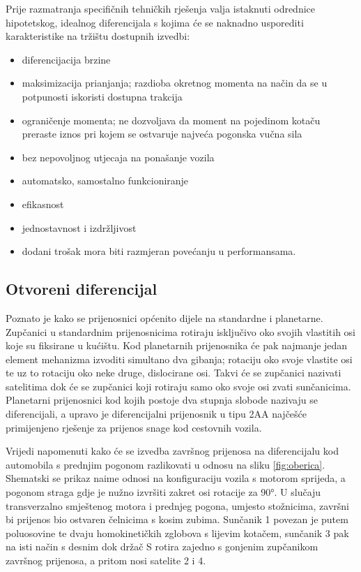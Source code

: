 \documentclass[11pt]{article}
\numberwithin{equation}{section}%
\begin{document}
Prije razmatranja specifičnih tehničkih rješenja valja istaknuti odrednice hipotetskog, idealnog diferencijala s kojima će se naknadno usporediti karakteristike na tržištu dostupnih izvedbi:
\begin{itemize}
\item diferencijacija brzine
\item maksimizacija prianjanja; razdioba okretnog momenta na način da se u potpunosti iskoristi dostupna trakcija
\item ograničenje momenta; ne dozvoljava da moment na pojedinom kotaču preraste iznos pri kojem se ostvaruje najveća pogonska vučna sila
\item bez nepovoljnog utjecaja na ponašanje vozila
\item automatsko, samostalno funkcioniranje
\item efikasnost
\item jednostavnost i izdržljivost
\item dodani trošak mora biti razmjeran povećanju u performansama.
\end{itemize}

	 \subsection{Otvoreni diferencijal}
Poznato je kako se prijenosnici općenito dijele na standardne i planetarne. Zupčanici u standardnim prijenosnicima rotiraju isključivo oko svojih vlastitih osi koje su fiksirane u kućištu. Kod planetarnih prijenosnika će pak najmanje jedan element mehanizma izvoditi simultano dva gibanja; rotaciju oko svoje vlastite osi te uz to rotaciju oko neke druge, dislocirane osi. Takvi će se zupčanici nazivati satelitima dok će se zupčanici koji rotiraju samo oko svoje osi zvati sunčanicima. Planetarni prijenosnici kod kojih postoje dva stupnja slobode nazivaju se diferencijali, a upravo je diferencijalni prijenosnik u tipu 2AA najčešće primijenjeno rješenje za prijenos snage kod cestovnih vozila.

Vrijedi napomenuti kako će se izvedba završnog prijenosa na diferencijalu kod automobila s prednjim pogonom razlikovati u odnosu na sliku \ref{fig:oberica}. Shematski se prikaz naime odnosi na konfiguraciju vozila s motorom sprijeda, a pogonom straga gdje je nužno izvršiti zakret osi rotacije za 90°. U slučaju transverzalno smještenog motora i prednjeg pogona, umjesto stožnicima, završni bi prijenos bio ostvaren čelnicima s kosim zubima. Sunčanik 1 povezan je putem poluosovine te dvaju homokinetičkih zglobova s lijevim kotačem, sunčanik 3 pak na isti način s desnim dok držač S rotira zajedno s gonjenim zupčanikom završnog prijenosa, a pritom nosi satelite 2 i 4.
\end{document}
